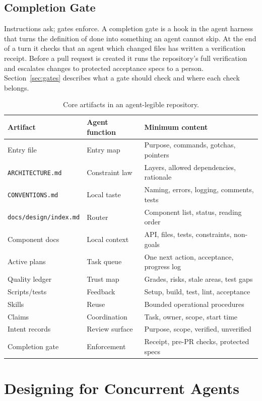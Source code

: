 \documentclass[11pt]{article}
\begin{document}
\subsection{Completion Gate}
Instructions ask; gates enforce. A completion gate is a hook in the agent harness that turns the definition of done into something an agent cannot skip. At the end of a turn it checks that an agent which changed files has written a verification receipt. Before a pull request is created it runs the repository's full verification and escalates changes to protected acceptance specs to a person. Section~\ref{sec:gates} describes what a gate should check and where each check belongs.

\begin{table}[h]
\centering
\begin{tabular}{lll}
\toprule
Artifact & Agent function & Minimum content \\
\midrule
Entry file & Entry map & Purpose, commands, gotchas, pointers \\
\texttt{ARCHITECTURE.md} & Constraint law & Layers, allowed dependencies, rationale \\
\texttt{CONVENTIONS.md} & Local taste & Naming, errors, logging, comments, tests \\
\texttt{docs/design/index.md} & Router & Component list, status, reading order \\
Component docs & Local context & API, files, tests, constraints, non-goals \\
Active plans & Task queue & One next action, acceptance, progress log \\
Quality ledger & Trust map & Grades, risks, stale areas, test gaps \\
Scripts/tests & Feedback & Setup, build, test, lint, acceptance \\
Skills & Reuse & Bounded operational procedures \\
Claims & Coordination & Task, owner, scope, start time \\
Intent records & Review surface & Purpose, scope, verified, unverified \\
Completion gate & Enforcement & Receipt, pre-PR checks, protected specs \\
\bottomrule
\end{tabular}
\caption{Core artifacts in an agent-legible repository.}
\end{table}

\section{Designing for Concurrent Agents}
\end{document}
